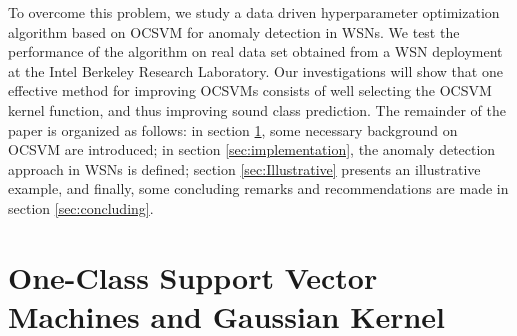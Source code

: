 \documentclass[conference]{IEEEtran}
\begin{document}
To overcome this problem, we study a data driven hyperparameter optimization algorithm based on 
OCSVM for anomaly detection in WSNs. We test the performance of the algorithm on real data set obtained from a WSN deployment at the Intel Berkeley 
Research Laboratory. Our investigations will show that one effective method for improving  OCSVMs  consists  of  well  selecting  the  OCSVM
kernel function, and thus improving sound class prediction. The remainder of the paper is organized as follows: 
in section \ref{sec:OCSVM}, some necessary background on OCSVM are introduced; in section \ref{sec:implementation}, the anomaly detection approach in WSNs is defined; section \ref{sec:Illustrative} presents an illustrative example, and finally, some concluding remarks and recommendations are made in section \ref{sec:concluding}.

\section{One-Class Support Vector Machines and Gaussian Kernel}\label{sec:OCSVM}
\end{document}
